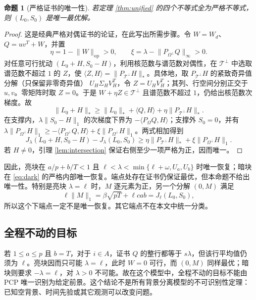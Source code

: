 \documentclass[UTF8,fontset=none,zihao=-4,a4paper]{ctexart}
\theoremstyle{plainzh}
\newtheorem{proposition}[theorem]{命题}
\newcommand{\ip}[2]{\langle #1,#2\rangle}
\newcommand{\nuc}[1]{\lVert #1\rVert_*}
\newcommand{\op}[1]{\lVert #1\rVert_{\mathrm{op}}}
\newcommand{\ellone}[1]{\lVert #1\rVert_1}
\newcommand{\maxnorm}[1]{\lVert #1\rVert_\infty}
\numberwithin{equation}{section}
\begin{document}
\begin{proposition}[严格证书的唯一性]\label{prop:unique}
若定理 \ref{thm:unified} 的四个不等式全为严格不等式，则 $(L_0,S_0)$ 是唯一最优解。
\end{proposition}
\begin{proof}
这是经典严格对偶证书的论证\cite[Proposition 2]{CSPW}\cite[Lemma 2.4]{CLMW}，在此写出所需步骤。令 $W=W_d$、$Q=uv^T+W$，并置
\[
 \eta=1-\op W>0,\qquad
 \xi=\lambda-\maxnorm{P_{\Omega^\perp}Q}>0.
\]
对任意可行扰动 $(L_0+H,S_0-H)$，利用核范数与谱范数对偶性，在 $\mathcal T^\perp$ 中选取谱范数不超过 $1$ 的 $Z$，使
$\ip ZH=\nuc{P_{\mathcal T^\perp}H}$。具体地，取 $P_{\mathcal T^\perp}H$ 的紧致奇异值分解（只保留非零奇异值） $U_H\Sigma_HV_H^T$，令 $Z=U_HV_H^T$；其列、行空间分别正交于 $u,v$。零矩阵时取 $Z=0$。于是 $W+\eta Z\in\mathcal T^\perp$ 且谱范数不超过 $1$，仍给出核范数次梯度。故
\[
 \nuc{L_0+H}\ge\nuc{L_0}+\ip QH+
 \eta\nuc{P_{\mathcal T^\perp}H}.
\]
在支撑内，$\lambda\ellone{S_0-H}$ 的次梯度下界为 $-\ip{P_\Omega Q}H$；支撑外 $S_0=0$，并有
$\lambda\ellone{P_{\Omega^\perp}H}\ge-\ip{P_{\Omega^\perp}Q}H+\xi\ellone{P_{\Omega^\perp}H}$。两式相加得到
\begin{equation}\label{eq:uniquegap}
 J_\lambda(L_0+H,S_0-H)-J_\lambda(L_0,S_0)
 \ge\eta\nuc{P_{\mathcal T^\perp}H}+\xi\ellone{P_{\Omega^\perp}H}.
\end{equation}
若 $H\ne0$，引理 \ref{lem:intersection} 保证右侧至少一项严格为正，因而唯一。
\end{proof}

因此，亮块在 $a/p+b/T<1$ 且 $\ell<\lambda<\min\{\ell+\omega,U_a,U_b\}$ 时唯一恢复；暗块在 \eqref{eq:dark} 的严格内部唯一恢复。端点处存在证书仍保证最优，但本命题不给出唯一性。特别是亮块 $\lambda=\ell$ 时，$M$ 逐元素为正，另一个分解 $(0,M)$ 满足
\[
 \ell\ellone M=\beta\sqrt{pT}+\ell cab=J_\ell(L_0,S_0),
\]
所以这个下端点一定不是唯一恢复。其它端点不在本文中统一分类。

\subsection{全程不动的目标}\label{sec:full}

若 $1\le a\le p$ 且 $b=T$，对于 $i\in A$，证书 $Q$ 的整行都等于 $s\lambda$，但该行平均值仍须为 $\ell$。亮块因而只可能 $\lambda=\ell$，此时 $W=0$ 可行，而 $(0,M)$ 同样最优；暗块则要求 $-\lambda=\ell$，对 $\lambda>0$ 不可能。故在这个模型中，全程不动的目标不能由 PCP 唯一识别为给定前景。这个结论不是所有背景分离模型的不可识别性定理：已知空背景、时间先验或其它观测可以改变问题。
\end{document}
